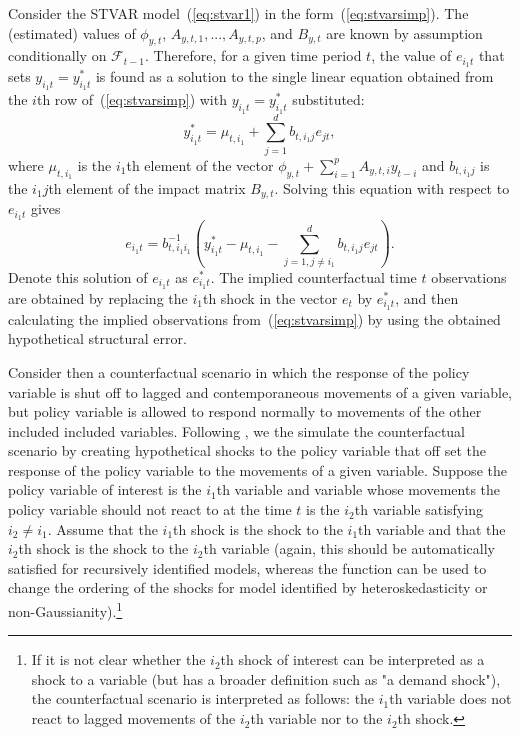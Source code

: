 \documentclass[nojss]{jss}
\begin{document}
Consider the STVAR model~(\ref{eq:stvar1}) in the form~(\ref{eq:stvarsimp}). The (estimated) values of $\phi_{y,t}$, $A_{y,t,1},...,A_{y,t,p}$, and $B_{y,t}$ are known by assumption conditionally on $\mathcal{F}_{t-1}$. Therefore, for a given time period $t$, the value of $e_{i_1t}$ that sets $y_{i_1t}=y_{i_1t}^{*}$ is found as a solution to the single linear equation obtained from the $i$th row of~(\ref{eq:stvarsimp}) with $y_{i_1t}=y_{i_1t}^{*}$ substituted:
\begin{equation}
 y_{i_1t}^{*} = \mu_{t,i_1} + \sum_{j=1}^d b_{t,i_1j} e_{jt},
\end{equation}
where $\mu_{t,i_1}$ is the $i_1$th element of the vector $\phi_{y,t} + \sum_{i=1}^pA_{y,t,i}y_{t-i}$ and $b_{t,i_1j}$ is the $i_1j$th element of the impact matrix $B_{y,t}$. Solving this equation with respect to $e_{i_1t}$ gives
\begin{equation}\label{eq:val_e_t}
e_{i_1t} = b_{t,i_1i_1}^{-1}\left(y_{i_1t}^{*} - \mu_{t,i_1} - \sum_{j=1, j\neq i_1}^d b_{t,i_1j} e_{jt}\right).
\end{equation}
Denote this solution of $e_{i_1t}$ as $e_{i_1t}^{*}$. The implied counterfactual time $t$ observations are obtained by replacing the $i_1$th shock in the vector $e_t$ by $e_{i_1t}^{*}$, and then calculating the implied observations from~(\ref{eq:stvarsimp}) by using the obtained hypothetical structural error.

Consider then a counterfactual scenario in which the response of the policy variable is shut off to lagged and contemporaneous movements of a given variable, but policy variable is allowed to respond normally to movements of the other included included variables. Following \cite{Kilian+Lewis:2011}, we the simulate the counterfactual scenario by creating hypothetical shocks to the policy variable that off set the response of the policy variable to the movements of a given variable. Suppose the policy variable of interest is the $i_1$th variable and variable whose movements the policy variable should not react to at the time $t$ is the $i_2$th variable satisfying $i_2\neq i_1$. Assume that the $i_1$th shock is the shock to the $i_1$th variable and that the $i_2$th shock is the shock to the $i_2$th variable (again, this should be automatically satisfied for recursively identified models, whereas the function  can be used to change the ordering of the shocks for model identified by heteroskedasticity or non-Gaussianity).\footnote{If it is not clear whether the $i_2$th shock of interest can be interpreted as a shock to a variable (but has a broader definition such as "a demand shock"), the counterfactual scenario is interpreted as follows: the $i_1$th variable does not react to lagged movements of the $i_2$th variable nor to the $i_2$th shock.}
\end{document}
